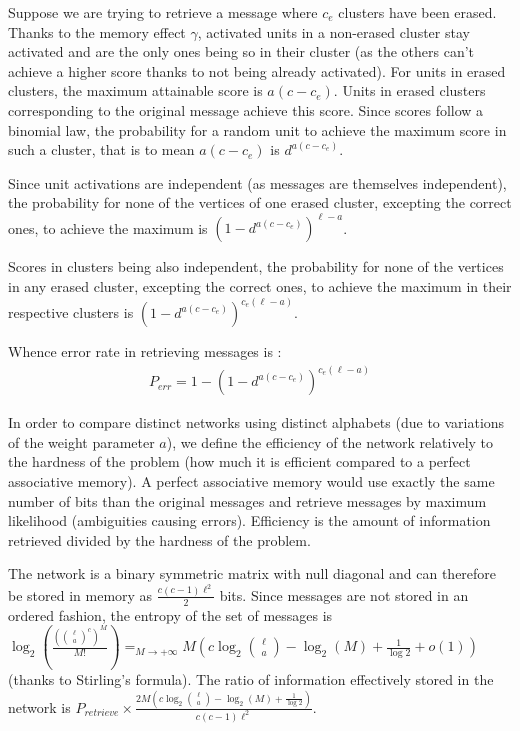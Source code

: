 \documentclass[english,10pt,twocolumn]{IEEEtran}
\theoremstyle{definition}
\begin{document}
	Suppose we are trying to retrieve a message where $c_e$ clusters have been erased. %
	Thanks to the memory effect $\gamma$, activated units in a non-erased cluster stay activated and are the only ones being so in their cluster (as the others can't achieve a higher score thanks to not being already activated). For units in erased clusters, the maximum attainable score is $a(c - c_e)$. Units in erased clusters corresponding to the original message achieve this score. Since scores follow a binomial law, the probability for a random unit to achieve the maximum score in such a cluster, that is to mean $a(c-c_e)$ is $d^{a(c-c_e)}$.
	
	
	Since unit activations are independent (as messages are themselves independent), the probability for none of the vertices of one erased cluster, excepting the correct ones, to achieve the maximum is $\left(1 - d^	{a(c-c_e)}\right)^{\ell-a}$.
	
	Scores in clusters being also independent, the probability for none of the vertices in any erased cluster, excepting the correct ones, to achieve the maximum in their respective clusters is $\left(1 - d^	{a(c-c_e)}\right)^{c_e(\ell-a)}$.
	
	Whence error rate in retrieving messages is : 
	\begin{align}	
	P_{err} = 1 -	\left(1 - d^	{a(c-c_e)}\right)^{c_e(\ell-a)} 
	\end{align}	 
	
	In order to compare distinct networks using distinct alphabets (due to variations of the weight parameter $a$), we define the efficiency of the network relatively to the hardness of the problem (how much it is efficient compared to a perfect associative memory). A perfect associative memory would use exactly the same number of bits than the original messages and retrieve messages by maximum likelihood (ambiguities causing errors). Efficiency is the amount of information retrieved divided by the hardness of the problem.
	
	The network is a binary symmetric matrix with null diagonal and can therefore be stored in memory as $\frac{c(c-1) \ell^2}{2}$ bits. Since messages are not stored in an ordered fashion, the entropy of the set of messages is $\log_2(\frac{({\ell \choose a}^c)^M}{M!}) \mathop{=}_{M \rightarrow +\infty} M(c \log_2{\ell \choose a } - \log_2(M) + \frac{1}{\log 2} + o(1)) $ (thanks to  Stirling's formula). The ratio of information effectively stored in the network is $P_{retrieve} \times  \frac{2M \left(c \log_2{\ell \choose a } - \log_2(M) + \frac{1}{\log 2} \right)}{c(c-1)\ell^2}$.
	
\end{document}
